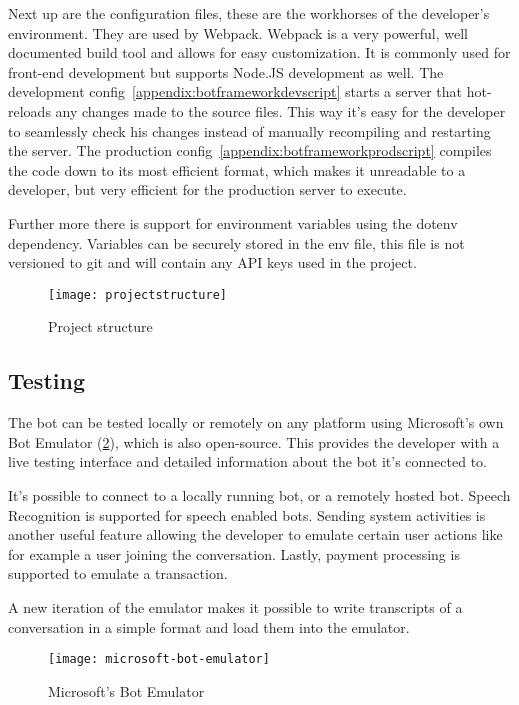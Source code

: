 Next up are the configuration files, these are the workhorses of the developer's environment. They are used by Webpack\cite{webpack}. Webpack is a very powerful, well documented build tool and allows for easy customization. It is commonly used for front-end development but supports Node.JS development as well. The development config~\ref{appendix:botframeworkdevscript} starts a server that hot-reloads any changes made to the source files. This way it's easy for the developer to seamlessly check his changes instead of manually recompiling and restarting the server. The production config~\ref{appendix:botframeworkprodscript} compiles the code down to its most efficient format, which makes it unreadable to a developer, but very efficient for the production server to execute.

Further more there is support for environment variables using the dotenv\cite{dotenv} dependency. Variables can be securely stored in the env file, this file is not versioned to git and will contain any API keys used in the project.

\begin{figure}[ht]
	\centering
	\texttt{[image: projectstructure]}
	\caption{Project structure}
	\label{fig:projectstructure}
\end{figure}

\subsection{Testing}

The bot can be tested locally or remotely on any platform using Microsoft's own Bot Emulator (\ref{fig:microsoft-bot-emulator}), which is also open-source. This provides the developer with a live testing interface and detailed information about the bot it's connected to.

It's possible to connect to a locally running bot, or a remotely hosted bot. Speech Recognition is supported for speech enabled bots. Sending system activities is another useful feature allowing the developer to emulate certain user actions like for example a user joining the conversation. Lastly, payment processing is supported to emulate a transaction.

A new iteration of the emulator makes it possible to write transcripts of a conversation in a simple format and load them into the emulator.

\begin{figure}[ht]
	\centering
	\texttt{[image: microsoft-bot-emulator]}
	\caption{Microsoft's Bot Emulator~\cite{microsoft-bot-emulator}}
	\label{fig:microsoft-bot-emulator}
\end{figure}

